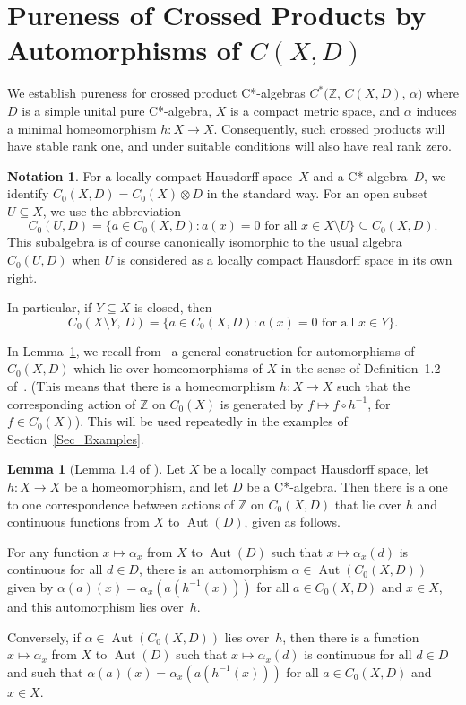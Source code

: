 \documentclass[10pt]{amsart}
\numberwithin{equation}{section}
\theoremstyle{definition}
\newtheorem{lem}[thm]{Lemma}
\newtheorem{ntn}[thm]{Notation}
\newcommand{\af}{\alpha}
\newcommand{\Z}{{\mathbb{Z}}}
\newcommand{\Aut}{{\operatorname{Aut}}}
\newcommand{\ca}{C*-algebra}
\newcommand{\ct}{continuous}
\newcommand{\chs}{compact Hausdorff space}
\newcommand{\hme}{homeomorphism}
\begin{document}
\section{Pureness of Crossed Products by
Automorphisms of $C (X, D)$}\label{Sec_PureCrossProd}

We establish pureness for crossed product C*-algebras
$C^* \bigl( \Z, \, C (X, D), \, \af \bigr)$ where $D$
is a simple unital pure C*-algebra, $X$ is a compact metric
space, and $\af$ induces a minimal homeomorphism $h \colon X \to X$.
Consequently, such crossed
products will have stable rank one, and under suitable
conditions will also have real rank zero.

\begin{ntn}\label{N_4Y12_C0UD}
For a locally \chs~$X$
and a \ca~$D$,
we identify $C_0 (X, D) = C_0 (X) \otimes D$
in the standard way.
For an open subset $U \subseteq X$,
we use the abbreviation
\[
C_0 (U, D)
= \big\{ a \in C_0 (X, D) \colon
{\mbox{$a (x) = 0$ for all $x \in X \setminus U$}} \big\}
\subseteq C_0 (X, D).
\]
This subalgebra is of course canonically isomorphic to
the usual algebra $C_0 (U, D)$ when $U$ is considered
as a locally \chs{} in its own right.
\end{ntn}

In particular,
if $Y \subseteq X$ is closed, then
%
\begin{equation}\label{Eq_4Y12_C0XYD}
C_0 (X \setminus Y, \, D)
= \big\{ a \in C_0 (X, D) \colon
{\mbox{$a (x) = 0$ for all $x \in Y$}} \big\}.
\end{equation}
%

In Lemma~\ref{L_1_GetAuto}, we recall from~\cite{ArBcPh2}
a general construction for automorphisms of $C_0 (X,D)$
which lie over homeomorphisms of $X$ in the sense
of Definition~1.2 of~\cite{ArBcPh2}. (This means that there
is a homeomorphism $h \colon X \to X$ such that the
corresponding action of $\Z$ on $C_0 (X)$ is generated by
$f \mapsto f \circ h^{-1}$, for $f \in C_0 (X)$).
This will be used repeatedly in the examples of
Section~\ref{Sec_Examples}.

\begin{lem}[Lemma 1.4 of \cite{ArBcPh2}]\label{L_1_GetAuto}
Let $X$ be a locally \chs, let $h \colon X \to X$ be a \hme,
and let $D$ be a \ca.
Then there is a one to one correspondence
between actions of $\Z$ on $C_0 (X, D)$ that lie over $h$ and
continuous functions from $X$ to $\Aut (D)$, given as follows.

For any function $x \mapsto \af_{x}$ from $X$ to $\Aut (D)$
such that $x \mapsto \af_{x} (d)$ is \ct{} for all $d \in D$,
there is an automorphism $\af \in \Aut ( C_0 (X, D))$
given by $\af (a) (x) = \af_x (a (h^{-1} (x)))$ for all
$a \in C_0 (X, D)$ and $x \in X$, and this automorphism lies
over~$h$.

Conversely, if $\af \in \Aut ( C_0 (X, D))$ lies over~$h$,
then there is a function $x \mapsto \af_{x}$ from $X$ to
$\Aut (D)$ such that $x \mapsto \af_{x} (d)$ is \ct{} for
all $d \in D$ and such that
$\af (a) (x) = \af_x (a (h^{-1} (x)))$ for all
$a \in C_0 (X, D)$ and $x \in X$.
\end{lem}
\end{document}
